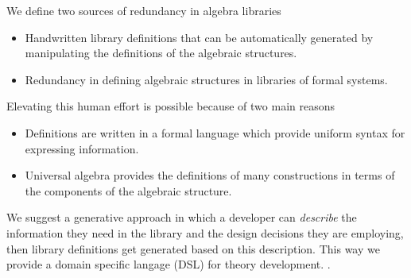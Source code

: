 We define two sources of redundancy in algebra libraries 
\begin{itemize}
    \item Handwritten library definitions that can be automatically generated by manipulating the definitions of the algebraic structures. 
    \item Redundancy in defining algebraic structures in libraries of formal systems. 
\end{itemize}

Elevating this human effort is possible because of two main reasons 
\begin{itemize}
    \item Definitions are written in a formal language which provide uniform syntax for expressing information. 
    \item Universal algebra provides the definitions of many constructions in terms of the components of the algebraic structure. 
\end{itemize}

We suggest a generative approach in which a developer can \emph{describe} the information they need in the library and the design decisions they are employing, then library definitions get generated based on this description. This way we provide a domain specific langage (DSL) for theory development. 
. 

